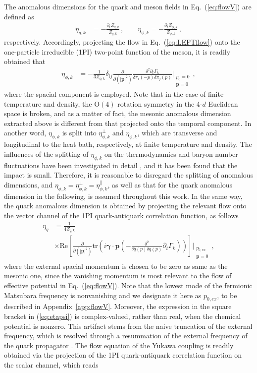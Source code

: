\documentclass[%
reprint,
superscriptaddress,
showpacs,preprintnumbers,
 amsmath,amssymb,
 aps,
prd,
]{revtex4-1}
\def\Eq#1{Eq.~(\ref{#1})}
\def\eq#1{(\ref{#1})}
\def\app#1{Appendix~\ref{#1}}
\begin{document}
The anomalous dimensions for the quark and meson fields in \Eq{eq:flowV} are defined as
%
\begin{align}
 \eta_{q,k}&=-\frac{\partial_t Z_{q,k}}{Z_{q,k}}\,,\qquad
  \eta_{\phi,k}=-\frac{\partial_t Z_{\phi,k}}{Z_{\phi,k}}\,,
\end{align}
%
respectively. Accordingly, projecting the flow in \Eq{eq:LEFTflow} onto the one-particle irreducible (1PI) two-point function of the meson, it is readily obtained that 
%
\begin{align}
  \eta_{\phi,k}&=-\frac{1}{3Z_{\phi,k}}\delta_{ij}\frac{\partial}{\partial (|\bm{p}|^2)}\frac{\delta^2 \partial_t \Gamma_k}{\delta \pi_i(-p) \delta \pi_j(p)}\Bigg|_{\substack{p_0=0\\ \bm{p}=0}}\,,\label{eq:etaphi}
\end{align}
%
where the spacial component is employed. Note that in the case of finite temperature and density, the $\mathrm{O}(4)$ rotation symmetry in the 4-$d$ Euclidean space is broken, and as a matter of fact, the mesonic anomalous dimension extracted above is different from that projected onto the temporal component. In another word, $\eta_{\phi,k}$ is split into $\eta_{\phi,k}^{\perp}$ and $\eta_{\phi,k}^{\parallel}$, which are transverse and longitudinal to the heat bath, respectively, at finite temperature and density. The influences of the splitting of $\eta_{\phi,k}$ on the thermodynamics and baryon number fluctuations have been investigated in detail \cite{Yin:2019ebz}, and it has been found that the impact is small. Therefore, it is reasonable to disregard the splitting of anomalous dimensions, and $\eta_{\phi,k}=\eta_{\phi,k}^{\perp}=\eta_{\phi,k}^{\parallel}$, as well as that for the quark anomalous dimension in the following, is assumed throughout this work. In the same way, the quark anomalous dimension is obtained by projecting the relevant flow onto the vector channel of the 1PI quark-antiquark correlation function, as follows
%
\begin{align}
  \eta_{q}&=\frac{1}{4 Z_{q,k}}\nonumber\\[2ex]
&\times\mathrm{Re}\left[\frac{\partial}{\partial (|\bm{p}|^2)}\mathrm{tr}
            \left(i \bm{\gamma}\cdot\bm{p}\left(-\frac{\delta^2}{\delta\bar{q}(p)
            \delta q(p)}\partial_t \Gamma_k\right)\right)\right]\Bigg|_{\substack{p_{0,ex}\\ \bm{p}=0}}\,,  \label{eq:etapsi}
\end{align}
%
where the external spacial momentum is chosen to be zero as same as the mesonic one, since the vanishing momentum is most relevant to the flow of effective potential in \Eq{eq:flowV}. Note that the lowest mode of the fermionic Matsubara frequency is nonvanishing and we designate it here as $p_{0,ex}$, to be described in \app{app:flowV}. Moreover, the expression in the square bracket in \eq{eq:etapsi} is complex-valued, rather than real, when the chemical potential is nonzero. This artifact stems from the naive truncation of the external frequency, which is resolved through a resummation of the external frequency of the quark propagator \cite{Fu:2016tey}. The flow equation of the Yukawa coupling is readily obtained via the projection of the 1PI quark-antiquark correlation function on the scalar channel, which reads
\end{document}
